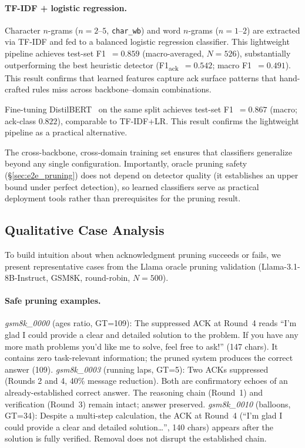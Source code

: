 \paragraph{TF-IDF + logistic regression.} Character $n$-grams ($n{=}2$--$5$, \texttt{char\_wb}) and word $n$-grams ($n{=}1$--$2$) are extracted via TF-IDF and fed to a balanced logistic regression classifier. This lightweight pipeline achieves test-set F1~$= 0.859$ (macro-averaged, $N{=}526$), substantially outperforming the best heuristic detector (F1\textsubscript{ack}~$= 0.542$; macro F1~$= 0.491$). This result confirms that learned features capture ack surface patterns that hand-crafted rules miss across backbone--domain combinations.

Fine-tuning DistilBERT~\citep{sanh_distilbert_2019} on the same split achieves test-set F1~$= 0.867$ (macro; ack-class $0.822$), comparable to TF-IDF+LR. This result confirms the lightweight pipeline as a practical alternative.

The cross-backbone, cross-domain training set ensures that classifiers generalize beyond any single configuration. Importantly, oracle pruning safety (\S\ref{sec:e2e_pruning}) does not depend on detector quality (it establishes an upper bound under perfect detection), so learned classifiers serve as practical deployment tools rather than prerequisites for the pruning result.

\subsection{Qualitative Case Analysis}
\label{app:qualitative}

To build intuition about when acknowledgment pruning succeeds or fails, we present representative cases from the Llama oracle pruning validation (Llama-3.1-8B-Instruct, GSM8K, round-robin, $N{=}500$).

\paragraph{Safe pruning examples.}
\emph{gsm8k\_0000} (ages ratio, GT=109): The suppressed ACK at Round~4 reads ``I'm glad I could provide a clear and detailed solution to the problem. If you have any more math problems you'd like me to solve, feel free to ask!'' (147 chars). It contains zero task-relevant information; the pruned system produces the correct answer (109).
\emph{gsm8k\_0003} (running laps, GT=5): Two ACKs suppressed (Rounds 2 and 4, 40\% message reduction). Both are confirmatory echoes of an already-established correct answer. The reasoning chain (Round~1) and verification (Round~3) remain intact; answer preserved.
\emph{gsm8k\_0010} (balloons, GT=34): Despite a multi-step calculation, the ACK at Round~4 (``I'm glad I could provide a clear and detailed solution\ldots'', 140 chars) appears after the solution is fully verified. Removal does not disrupt the established chain.

